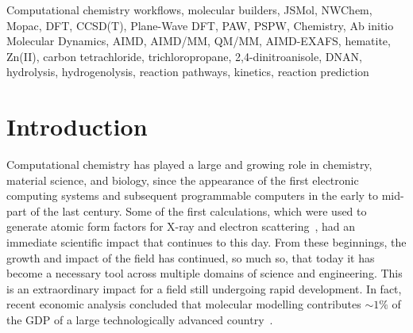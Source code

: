 \documentclass[runningheads,a4paper]{llncs}
\begin{document}
\begin{keywords}
Computational chemistry workflows, molecular builders, JSMol, NWChem, Mopac, DFT, CCSD(T), Plane-Wave DFT, PAW, PSPW, Chemistry, Ab initio Molecular Dynamics, AIMD, AIMD/MM, QM/MM, AIMD-EXAFS, hematite, Zn(II), carbon tetrachloride, trichloropropane, 2,4-dinitroanisole, DNAN, hydrolysis, hydrogenolysis, reaction pathways, kinetics, reaction prediction
\end{keywords}

\section{Introduction}
\label{sec:Introduction}
Computational chemistry has played a large and growing role in chemistry, material science, and biology, since the appearance of the first electronic computing systems and subsequent programmable computers in the early to mid-part of the last century.  Some of the first calculations, which were used to generate atomic form factors for X-ray and electron scattering~\cite{cromer1965scattering}, had an immediate scientific impact that continues to this day.  From these beginnings, the growth and impact of the field has continued, %
so much so, that today it has become a necessary tool across multiple domains of science and engineering.  This is an extraordinary impact for a field still undergoing rapid development. In fact, recent economic analysis concluded that molecular modelling contributes $\sim 1\%$ of the GDP of a large technologically advanced country~\cite{goldbeck2012economic}.  %


\end{document}
